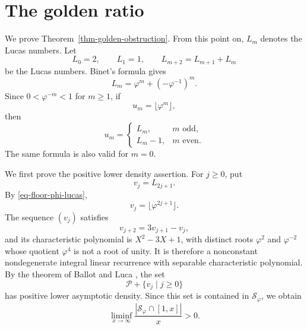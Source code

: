 \documentclass[11pt,reqno]{amsart}
\numberwithin{equation}{section}
\begin{document}
    \section{The golden ratio}\label{sec-golden-proof}

    We prove Theorem~\ref{thm-golden-obstruction}. From this point on, $L_m$ denotes the Lucas numbers. Let
    $$
    L_0=2,\qquad L_1=1,\qquad L_{m+2}=L_{m+1}+L_m
    $$
    be the Lucas numbers. Binet's formula gives
    $$
    L_m=\varphi^m+(-\varphi^{-1})^m.
    $$
    Since $0<\varphi^{-m}<1$ for $m\ge1$, if
    $$
    u_m=\lfloor \varphi^m\rfloor,
    $$
    then
    \begin{equation}\label{eq-floor-phi-lucas}
        u_m=
        \begin{cases}
            L_m, & m\text{ odd},\\
            L_m-1, & m\text{ even}.
        \end{cases}
    \end{equation}
    The same formula is also valid for $m=0$.

    We first prove the positive lower density assertion. For $j\ge0$, put
    $$
    v_j=L_{2j+1}.
    $$
    By \eqref{eq-floor-phi-lucas},
    $$
    v_j=\lfloor\varphi^{2j+1}\rfloor.
    $$
    The sequence $(v_j)$ satisfies
    $$
    v_{j+2}=3v_{j+1}-v_j,
    $$
    and its characteristic polynomial is $X^2-3X+1$, with distinct roots $\varphi^2$ and $\varphi^{-2}$ whose quotient $\varphi^4$ is not a root of unity. It is therefore a nonconstant nondegenerate integral linear recurrence with separable characteristic polynomial. By the theorem of Ballot and Luca \cite[Theorem~1]{BallotLuca}, the set
    $$
    \mathcal{P}+\{v_j\mid j\ge0\}
    $$
    has positive lower asymptotic density. Since this set is contained in $\mathcal{S}_\varphi$, we obtain
    $$
    \liminf_{x\to\infty}
    \frac{\left|\mathcal{S}_\varphi\cap[1,x]\right|}{x}>0.
    $$
\end{document}
